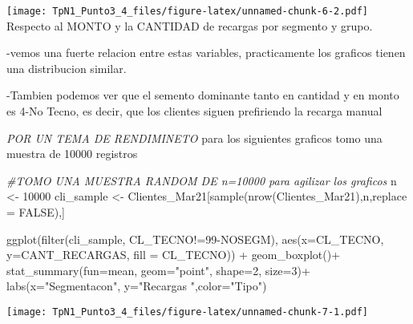 \documentclass[
]{article}
\newenvironment{Shaded}{\begin{snugshade}}{\end{snugshade}}
\newcommand{\AttributeTok}[1]{\textcolor[rgb]{0.77,0.63,0.00}{#1}}
\newcommand{\CommentTok}[1]{\textcolor[rgb]{0.56,0.35,0.01}{\textit{#1}}}
\newcommand{\ConstantTok}[1]{\textcolor[rgb]{0.00,0.00,0.00}{#1}}
\newcommand{\DecValTok}[1]{\textcolor[rgb]{0.00,0.00,0.81}{#1}}
\newcommand{\FunctionTok}[1]{\textcolor[rgb]{0.00,0.00,0.00}{#1}}
\newcommand{\NormalTok}[1]{#1}
\newcommand{\OtherTok}[1]{\textcolor[rgb]{0.56,0.35,0.01}{#1}}
\newcommand{\SpecialCharTok}[1]{\textcolor[rgb]{0.00,0.00,0.00}{#1}}
\newcommand{\StringTok}[1]{\textcolor[rgb]{0.31,0.60,0.02}{#1}}
\begin{document}
\texttt{[image: TpN1\_Punto3\_4\_files/figure-latex/unnamed-chunk-6-2.pdf]}
Respecto al MONTO y la CANTIDAD de recargas por segmento y grupo.

-vemos una fuerte relacion entre estas variables, practicamente los
graficos tienen una distribucion similar.

-Tambien podemos ver que el semento dominante tanto en cantidad y en
monto es 4-No Tecno, es decir, que los clientes siguen prefiriendo la
recarga manual

\emph{POR UN TEMA DE RENDIMINETO }para los siguientes graficos tomo una
muestra de 10000 registros

\begin{Shaded}
\begin{Highlighting}[]
\CommentTok{\#TOMO UNA MUESTRA RANDOM DE n=10000 para agilizar los graficos}
\NormalTok{n }\OtherTok{\textless{}{-}} \DecValTok{10000}
\NormalTok{cli\_sample }\OtherTok{\textless{}{-}}\NormalTok{ Clientes\_Mar21[}\FunctionTok{sample}\NormalTok{(}\FunctionTok{nrow}\NormalTok{(Clientes\_Mar21),n,}\AttributeTok{replace =} \ConstantTok{FALSE}\NormalTok{),]}

\FunctionTok{ggplot}\NormalTok{(}\FunctionTok{filter}\NormalTok{(cli\_sample, CL\_TECNO}\SpecialCharTok{!=}\StringTok{\textquotesingle{}99{-}NOSEGM\textquotesingle{}}\NormalTok{), }\FunctionTok{aes}\NormalTok{(}\AttributeTok{x=}\NormalTok{CL\_TECNO, }\AttributeTok{y=}\NormalTok{CANT\_RECARGAS, }\AttributeTok{fill =}\NormalTok{ CL\_TECNO)) }\SpecialCharTok{+} 
  \FunctionTok{geom\_boxplot}\NormalTok{()}\SpecialCharTok{+}
  \FunctionTok{stat\_summary}\NormalTok{(}\AttributeTok{fun=}\NormalTok{mean, }\AttributeTok{geom=}\StringTok{"point"}\NormalTok{, }\AttributeTok{shape=}\DecValTok{2}\NormalTok{, }\AttributeTok{size=}\DecValTok{3}\NormalTok{)}\SpecialCharTok{+}
  \FunctionTok{labs}\NormalTok{(}\AttributeTok{x=}\StringTok{"Segmentacon"}\NormalTok{,  }\AttributeTok{y=}\StringTok{"Recargas "}\NormalTok{,}\AttributeTok{color=}\StringTok{"Tipo"}\NormalTok{)}
\end{Highlighting}
\end{Shaded}

\texttt{[image: TpN1\_Punto3\_4\_files/figure-latex/unnamed-chunk-7-1.pdf]}
\end{document}
